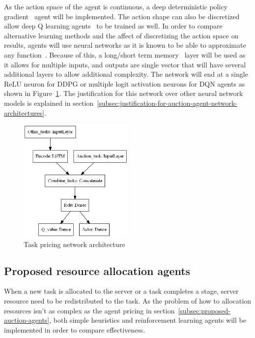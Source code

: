 As the action space of the agent is continuous, a deep deterministic policy gradient~\citep{ddpg} agent
will be implemented. The action shape can also be discretized allow deep Q learning agents~\cite{atari} to be trained
as well. In order to compare alternative learning methods and the affect of discretizing the action space on results,
agents will use neural networks as it is known to be able to approximate any
function~\citep{csaji2001approximation}. Because of this, a long/short term memory~\citep{LSTM} layer will be used as
it allows for multiple inputs, and outputs are single vector that will have several additional layers to allow
additional complexity. The network will end at a single ReLU neuron for DDPG or multiple logit activation neurons for
DQN agents as shown in Figure~\ref{fig:task_pricing_network_architecture}. The justification for this network over
other neural network models is explained in section~\ref{subsec:justification-for-auction-agent-network-architectures}.

\begin{figure}
    \centering
    \includegraphics[width=0.5\textwidth]{figures/solution_fig/task_pricing_network_architecture.png}
    \caption{Task pricing network architecture}
    \label{fig:task_pricing_network_architecture}
\end{figure}

\subsection{Proposed resource allocation agents}\label{subsec:proposed-resource-allocation-agents}
When a new task is allocated to the server or a task completes a stage, server resource need to be redistributed
to the task. As the problem of how to allocation resources isn't as complex as the agent pricing in
section~\ref{subsec:proposed-auction-agents}, both simple heuristics and reinforcement learning agents will be
implemented in order to compare effectiveness.

